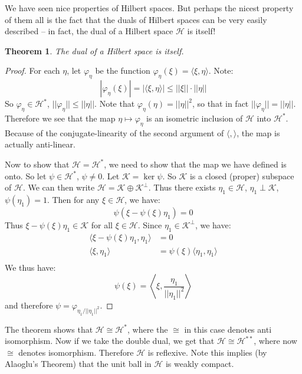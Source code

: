\documentclass[a4paper,12pt]{report}
\newcommand{\ms}[1]{\mathscr{#1}}
\newcommand{\vphi} {\varphi}
\newtheorem{theorem}{Theorem}[section]
\begin{document}
	We have seen nice properties of Hilbert spaces. But perhaps the nicest property of them all is the fact that the duals of Hilbert spaces can be very easily described -- in fact, the dual of a Hilbert space $\ms{H}$ is itself!
	
	\begin{theorem}
	The dual of a Hilbert space is itself. 
	\end{theorem}
	\begin{proof}
	For each $\eta$, let $\vphi_\eta$ be the function $\vphi_\eta(\xi) = \langle \xi, \eta \rangle$. Note:
	\[ |\vphi_\eta(\xi)| = |\langle \xi, \eta \rangle| \leq ||\xi|| \cdot ||\eta|| \]
	So $\vphi_\eta \in \ms{H}^*$, $||\vphi_\eta|| \leq ||\eta||$. Note that $\vphi_\eta(\eta) = ||\eta||^2$, so that in fact $||\vphi_\eta|| = ||\eta||$. Therefore we see that the map $\eta \mapsto \vphi_\eta$ is an isometric inclusion of $\ms{H}$ into $\ms{H}^*$. Because of the conjugate-linearity of the second argument of $\langle, \rangle$, the map is actually anti-linear.
	
	Now to show that $\ms{H} = \ms{H}^*$, we need to show that the map we have defined is onto. So let $\psi \in \ms{H}^*$, $\psi \neq 0$. Let $\ms{K} = \ker \psi$. So $\ms{K}$ is a closed (proper) subspace of $\ms{H}$. We can then write $\ms{H} = \ms{K} \oplus \ms{K}^\perp$. Thus there exists $\eta_1 \in \ms{H}$, $\eta_1 \perp \ms{K}$, $\psi(\eta_1) = 1$. Then for any $\xi \in \ms{H}$, we have:
	\[ \psi(\xi - \psi(\xi) \eta_1) = 0 \]
	Thus $\xi - \psi(\xi) \eta_1 \in \ms{K}$ for all $\xi \in \ms{H}$. Since $\eta_1 \in \ms{K}^\perp$, we have:
	\begin{align*}
	\langle \xi - \psi(\xi) \eta_1, \eta_1 \rangle &= 0 \\
	\langle \xi, \eta_1 \rangle &= \psi(\xi) \langle \eta_1, \eta_1 \rangle \\
	\end{align*}
	We thus have:
	\[ \psi(\xi) = \left\langle \xi, \frac{\eta_1}{||\eta_1||^2} \right\rangle \]
	and therefore $\psi = \vphi_{\eta_1 / ||\eta_1||^2}$. 
	\end{proof}
	
	\noindent The theorem shows that $\ms{H} \cong \ms{H}^*$, where the $\cong$ in this case denotes anti isomorphism. Now if we take the double dual, we get that $\ms{H} \cong \ms{H}^{**}$, where now $\cong$ denotes isomorphism. Therefore $\ms{H}$ is reflexive. Note this implies (by Alaoglu's Theorem) that the unit ball in $\ms{H}$ is weakly compact. 
	
\end{document}
